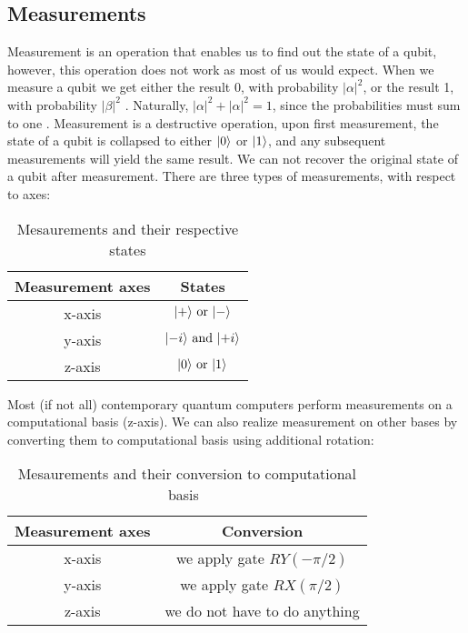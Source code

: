 \subsection{Measurements}
Measurement is an operation that enables us to find out the state of a qubit, however, this operation does not work as most of us would expect. When we measure a qubit we get either the result 0, with probability $\lvert \alpha \rvert^2$, or the result 1, with probability $\lvert \beta \rvert^2$ \cite{qc}. Naturally, $\lvert \alpha \rvert^2 + \lvert \alpha \rvert^2 = 1$, since the probabilities must sum to one \cite{qc}. Measurement is a destructive operation, upon first measurement, the state of a qubit is collapsed to either $\lvert0\rangle$ or $\lvert1\rangle$, and any subsequent measurements will yield the same result. We can not recover the original state of a qubit after measurement. There are three types of measurements, with respect to axes:
\begin{table}[H]
  \centering
  \begin{tabular}{|c|c|} 
      \hline
      \multicolumn{1}{|c|}{\textbf{Measurement axes}} & \textbf{States}\\
      \hline
      x-axis & $\lvert+\rangle \text{ or }\lvert-\rangle$ \\ 
      \hline
      y-axis & $\lvert-i\rangle \text{ and }\lvert+i\rangle$ \\ 
      \hline
      z-axis & $\lvert0\rangle \text{ or }\lvert1\rangle$ \\ 
      \hline
  \end{tabular}
  \caption{Mesaurements and their respective states}
  \label{tab:measurements-states}
\end{table}
Most (if not all) contemporary quantum computers perform measurements on a computational basis (z-axis). We can also realize measurement on other bases by converting them to computational basis using additional rotation:

\begin{table}[H]
  \centering
  \begin{tabular}{|c|c|} 
      \hline
      \multicolumn{1}{|c|}{\textbf{Measurement axes}} & \textbf{Conversion}\\
      \hline
      x-axis & we apply gate $RY(-\pi/2)$ \\ 
      \hline
      y-axis & we apply gate $RX(\pi/2)$ \\ 
      \hline
      z-axis & we do not have to do anything \\ 
      \hline
  \end{tabular}
  \caption{Mesaurements and their conversion to computational basis~\cite{blog}}
  \label{tab:measurements-conversion}
\end{table}
\\

